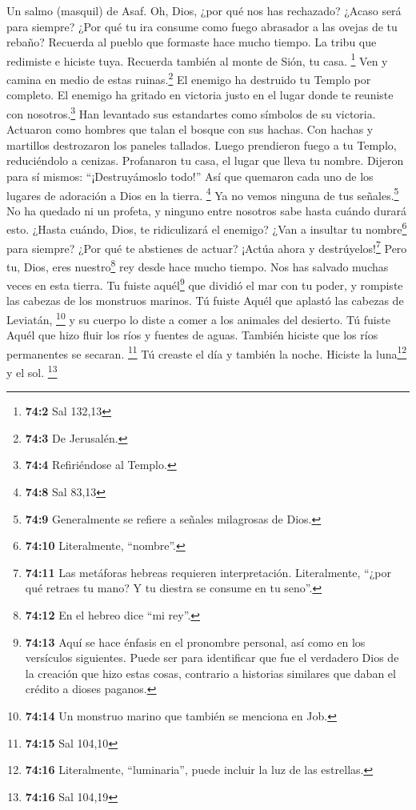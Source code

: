 Un salmo (masquil) de Asaf.  Oh, Dios, ¿por qué nos has
rechazado? ¿Acaso será para siempre? ¿Por qué tu ira consume como fuego
abrasador a las ovejas de tu rebaño?  Recuerda al pueblo
que formaste hace mucho tiempo. La tribu que redimiste e hiciste tuya.
Recuerda también al monte de Sión, tu casa. \footnote{\textbf{74:2} Sal
  132,13}  Ven y camina en medio de estas
ruinas.\footnote{\textbf{74:3} De Jerusalén.} El enemigo ha destruido tu
Templo por completo.  El enemigo ha gritado en victoria
justo en el lugar donde te reuniste con nosotros.\footnote{\textbf{74:4}
  Refiriéndose al Templo.} Han levantado sus estandartes como símbolos
de su victoria.  Actuaron como hombres que talan el bosque
con sus hachas.  Con hachas y martillos destrozaron los
paneles tallados.  Luego prendieron fuego a tu Templo,
reduciéndolo a cenizas. Profanaron tu casa, el lugar que lleva tu
nombre.  Dijeron para sí mismos: ``¡Destruyámoslo todo!''
Así que quemaron cada uno de los lugares de adoración a Dios en la
tierra. \footnote{\textbf{74:8} Sal 83,13}  Ya no vemos
ninguna de tus señales.\footnote{\textbf{74:9} Generalmente se refiere a
  señales milagrosas de Dios.} No ha quedado ni un profeta, y ninguno
entre nosotros sabe hasta cuándo durará esto.  ¿Hasta
cuándo, Dios, te ridiculizará el enemigo? ¿Van a insultar tu
nombre\footnote{\textbf{74:10} Literalmente, ``nombre''.} para siempre?
 ¿Por qué te abstienes de actuar? ¡Actúa ahora y
destrúyelos!\footnote{\textbf{74:11} Las metáforas hebreas requieren
  interpretación. Literalmente, ``¿por qué retraes tu mano? Y tu diestra
  se consume en tu seno''.}  Pero tu, Dios, eres
nuestro\footnote{\textbf{74:12} En el hebreo dice ``mi rey''.} rey desde
hace mucho tiempo. Nos has salvado muchas veces en esta tierra.
 Tu fuiste aquél\footnote{\textbf{74:13} Aquí se hace
  énfasis en el pronombre personal, así como en los versículos
  siguientes. Puede ser para identificar que fue el verdadero Dios de la
  creación que hizo estas cosas, contrario a historias similares que
  daban el crédito a dioses paganos.} que dividió el mar con tu poder, y
rompiste las cabezas de los monstruos marinos.  Tú fuiste
Aquél que aplastó las cabezas de Leviatán, \footnote{\textbf{74:14} Un
  monstruo marino que también se menciona en Job.} y su cuerpo lo diste
a comer a los animales del desierto.  Tú fuiste Aquél que
hizo fluir los ríos y fuentes de aguas. También hiciste que los ríos
permanentes se secaran. \footnote{\textbf{74:15} Sal 104,10}
 Tú creaste el día y también la noche. Hiciste la
luna\footnote{\textbf{74:16} Literalmente, ``luminaria'', puede incluir
  la luz de las estrellas.} y el sol. \footnote{\textbf{74:16} Sal
  104,19}

